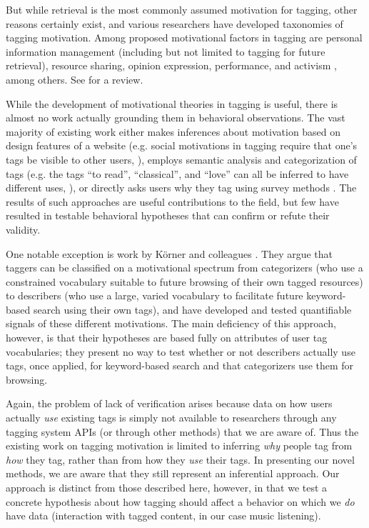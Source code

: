 But while retrieval is the most commonly assumed motivation for tagging, other reasons certainly exist, and various researchers have developed taxonomies of tagging motivation. Among proposed motivational factors in tagging are personal information management (including but not limited to tagging for future retrieval), resource sharing, opinion expression, performance, and activism \cite{Heckner2009,Zollers2007,Ames2007}, among others. See \cite{Gupta2010} for a review.

While the development of motivational theories in tagging is useful, there is almost no work actually grounding them in behavioral observations. The vast majority of existing work either makes inferences about motivation based on design features of a website (e.g. social motivations in tagging require that one's tags be visible to other users, \cite{Marlow2006}), employs semantic analysis and categorization of tags (e.g. the tags ``to read'', ``classical'', and ``love'' can all be inferred to have different uses, \cite{Zollers2007,Sen2006}), or directly asks users why they tag using survey methods \cite{Ames2007,Nov2008}. The results of such approaches are useful contributions to the field, but few have resulted in testable behavioral hypotheses that can confirm or refute their validity.

One notable exception is work by K\"{o}rner and colleagues \cite{Korner2010,Korner2010a,Zubiaga2011}. They argue that taggers can be classified on a motivational spectrum from categorizers (who use a constrained vocabulary suitable to future browsing of their own tagged resources) to describers (who use a large, varied vocabulary to facilitate future keyword-based search using their own tags), and have developed and tested quantifiable signals of these different motivations. The main deficiency of this approach, however, is that their hypotheses are based fully on attributes of user tag vocabularies; they present no way to test whether or not describers actually use tags, once applied, for keyword-based search and that categorizers use them for browsing.

Again, the problem of lack of verification arises because data on how users actually \emph{use} existing tags is simply not available to researchers through any tagging system APIs (or through other methods) that we are aware of. Thus the existing work on tagging motivation is limited to inferring \emph{why} people tag from \emph{how} they tag, rather than from how they \emph{use} their tags. In presenting our novel methods, we are aware that they still represent an inferential approach. Our approach is distinct from those described here, however, in that we test a concrete hypothesis about how tagging should affect a behavior on which we \emph{do} have data (interaction with tagged content, in our case music listening).
